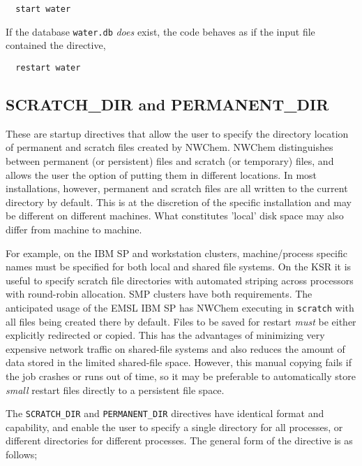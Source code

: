 \begin{verbatim}
  start water
\end{verbatim}

If the database \verb+water.db+ {\it does} exist,
the code behaves as if the input file contained the directive,

\begin{verbatim}
  restart water
\end{verbatim}


\subsection{SCRATCH\_DIR and PERMANENT\_DIR}
\label{sec:dirs}


These are startup directives that allow the user to specify the
directory location of permanent and scratch files created by NWChem.
NWChem distinguishes between permanent (or persistent) files and
scratch (or temporary) files, and allows the user the option of
putting them in different locations.  In most installations, however,
permanent and scratch files are all written to the current directory
by default.  This is at the discretion of the specific installation
and may be different on different machines.  What constitutes 'local'
disk space may also differ from machine to machine.

For example, on the IBM SP and workstation clusters, machine/process
specific names must be specified for both local and shared file
systems.  On the KSR it is useful to specify scratch file directories
with automated striping across processors with round-robin allocation.
SMP clusters have both requirements.  The anticipated usage of the
EMSL IBM SP has NWChem executing in \verb+scratch+ with all files
being created there by default.  Files to be saved for restart {\em
  must} be either explicitly redirected or copied.  This has the
advantages of minimizing very expensive network traffic on shared-file
systems and also reduces the amount of data stored in the limited
shared-file space.  However, this manual copying fails if the job
crashes or runs out of time, so it may be preferable to automatically
store {\em small} restart files directly to a persistent file space.

The \verb+SCRATCH_DIR+ and \verb+PERMANENT_DIR+ directives have
identical format and capability, and enable the user to specify a
single directory for all processes, or different directories for
different processes.  The general form of the directive is as follows;

